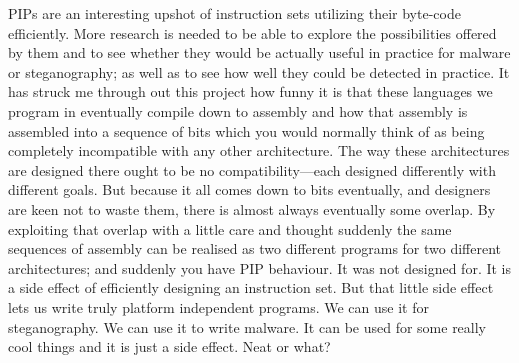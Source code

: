 \documentclass[10pt,]{book}
\begin{document}
PIPs are an interesting upshot of instruction sets utilizing their
byte-code efficiently. More research is needed to be able to explore the
possibilities offered by them and to see whether they would be actually
useful in practice for malware or steganography; as well as to see how
well they could be detected in practice. It has struck me through out
this project how funny it is that these languages we program in
eventually compile down to assembly and how that assembly is assembled
into a sequence of bits which you would normally think of as being
completely incompatible with any other architecture. The way these
architectures are designed there ought to be no compatibility---each
designed differently with different goals. But because it all comes down
to bits eventually, and designers are keen not to waste them, there is
almost always eventually some overlap. By exploiting that overlap with a
little care and thought suddenly the same sequences of assembly can be
realised as two different programs for two different architectures; and
suddenly you have PIP behaviour. It was not designed for. It is a side
effect of efficiently designing an instruction set. But that little side
effect lets us write truly platform independent programs. We can use it
for steganography. We can use it to write malware. It can be used for
some really cool things and it is just a side effect. Neat or what?

\appendix

\printbibliography[title=Bibliography]
\end{document}
